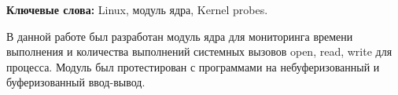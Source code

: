 \begin{essay}{}

\textbf{Ключевые слова:} Linux, модуль ядра, Kernel probes.

В данной работе был разработан модуль ядра для мониторинга времени выполнения и количества выполнений системных вызовов open, read, write для процесса. Модуль был протестирован с программами на небуферизованный и буферизованный ввод-вывод.

\end{essay}